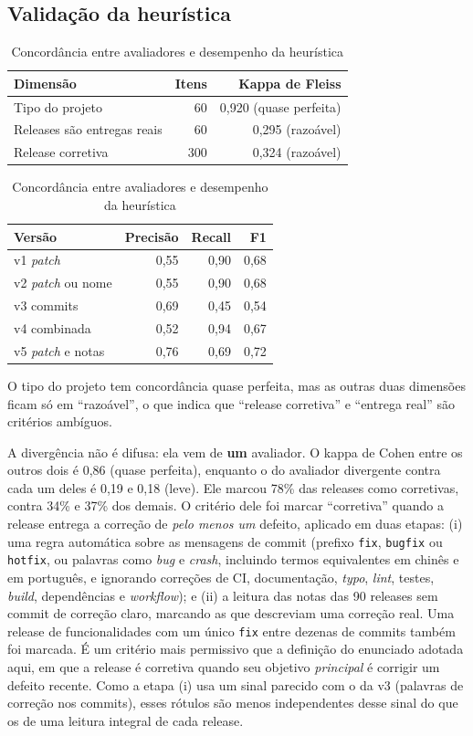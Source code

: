 \documentclass[12pt]{article}
\begin{document}
\subsection{Validação da heurística}

\begin{table}[ht]
\centering
\caption{Concordância entre avaliadores e desempenho da heurística}
\label{tab:val}
\small
\begin{tabular}{lrr}
\toprule
Dimensão & Itens & Kappa de Fleiss \\
\midrule
Tipo do projeto & 60 & 0,920 (quase perfeita) \\
Releases são entregas reais & 60 & 0,295 (razoável) \\
Release corretiva & 300 & 0,324 (razoável) \\
\bottomrule
\end{tabular}

\vspace{6pt}
\begin{tabular}{lrrr}
\toprule
Versão & Precisão & Recall & F1 \\
\midrule
v1 \emph{patch} & 0,55 & 0,90 & 0,68 \\
v2 \emph{patch} ou nome & 0,55 & 0,90 & 0,68 \\
v3 commits & 0,69 & 0,45 & 0,54 \\
v4 combinada & 0,52 & 0,94 & 0,67 \\
v5 \emph{patch} e notas & 0,76 & 0,69 & 0,72 \\
\bottomrule
\end{tabular}
\end{table}

O tipo do projeto tem concordância quase perfeita, mas as outras duas
dimensões ficam só em ``razoável'', o que indica que ``release corretiva'' e
``entrega real'' são critérios ambíguos.

A divergência não é difusa: ela vem de \textbf{um} avaliador. O kappa de Cohen
entre os outros dois é 0,86 (quase perfeita), enquanto o do avaliador
divergente contra cada um deles é 0,19 e 0,18 (leve). Ele marcou 78\% das
releases como corretivas, contra 34\% e 37\% dos demais. O critério dele foi
marcar ``corretiva'' quando a release entrega a correção de \emph{pelo menos um}
defeito, aplicado em duas etapas: (i) uma regra automática sobre as mensagens de
commit (prefixo \texttt{fix}, \texttt{bugfix} ou \texttt{hotfix}, ou palavras como
\emph{bug} e \emph{crash}, incluindo termos equivalentes em chinês e em português,
e ignorando correções de CI, documentação, \emph{typo}, \emph{lint}, testes,
\emph{build}, dependências e \emph{workflow}); e (ii) a leitura das notas das 90
releases sem commit de correção claro, marcando as que descreviam uma correção
real. Uma release de funcionalidades com um único \texttt{fix} entre dezenas de
commits também foi marcada. É um critério mais permissivo que a definição do
enunciado adotada aqui, em que a release é corretiva quando seu objetivo
\emph{principal} é corrigir um defeito recente. Como a etapa (i) usa um sinal
parecido com o da v3 (palavras de correção nos commits), esses rótulos são menos
independentes desse sinal do que os de uma leitura integral de cada release.
\end{document}
